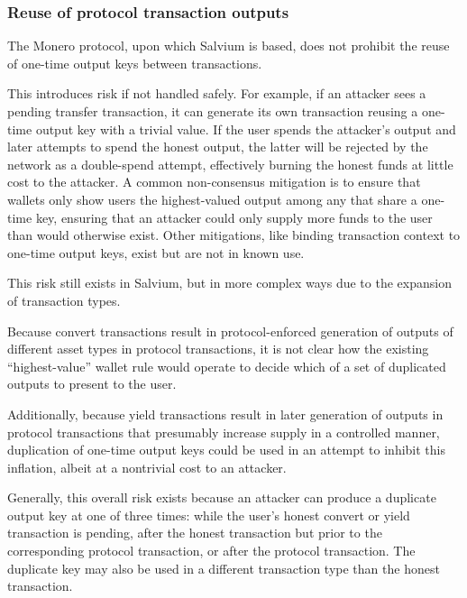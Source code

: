 \documentclass{article}
\begin{document}
\subsubsection{Reuse of protocol transaction outputs}

The Monero protocol, upon which Salvium is based, does not prohibit the reuse of one-time output keys between transactions.

This introduces risk if not handled safely.
For example, if an attacker sees a pending transfer transaction, it can generate its own transaction reusing a one-time output key with a trivial value.
If the user spends the attacker's output and later attempts to spend the honest output, the latter will be rejected by the network as a double-spend attempt, effectively burning the honest funds at little cost to the attacker.
A common non-consensus mitigation is to ensure that wallets only show users the highest-valued output among any that share a one-time key, ensuring that an attacker could only supply more funds to the user than would otherwise exist.
Other mitigations, like binding transaction context to one-time output keys, exist but are not in known use.

This risk still exists in Salvium, but in more complex ways due to the expansion of transaction types.

Because convert transactions result in protocol-enforced generation of outputs of different asset types in protocol transactions, it is not clear how the existing ``highest-value'' wallet rule would operate to decide which of a set of duplicated outputs to present to the user.

Additionally, because yield transactions result in later generation of outputs in protocol transactions that presumably increase supply in a controlled manner, duplication of one-time output keys could be used in an attempt to inhibit this inflation, albeit at a nontrivial cost to an attacker.

Generally, this overall risk exists because an attacker can produce a duplicate output key at one of three times: while the user's honest convert or yield transaction is pending, after the honest transaction but prior to the corresponding protocol transaction, or after the protocol transaction.
The duplicate key may also be used in a different transaction type than the honest transaction.
\end{document}
